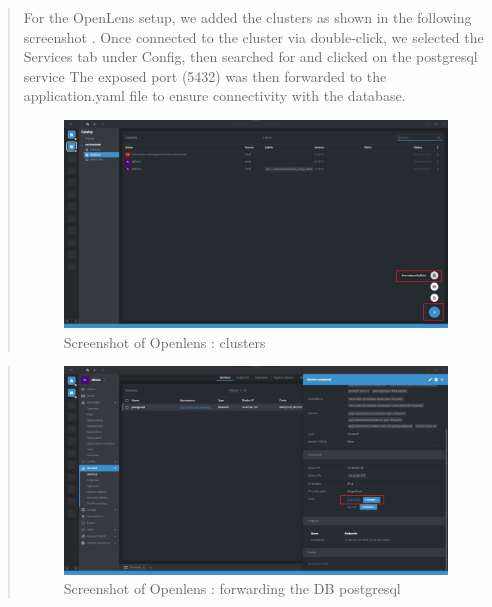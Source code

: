 \documentclass[12pt,a4paper]{report}
\begin{document}
\begin{quote}
For the OpenLens setup, we added the clusters as shown in the following
screenshot . Once connected to the cluster via double-click, we selected
the Services tab under Config, then searched for and clicked on the
postgresql service The exposed port (5432) was then forwarded to the
application.yaml file to ensure connectivity with the database.

\begin{figure}[H]
\centering
\includegraphics[width=\textwidth,height=\textheight,keepaspectratio]{media/image67.jpeg}
\caption{Screenshot of Openlens : clusters}
\label{fig:OC}
\end{figure} 

\end{quote}
\begin{quote}

\begin{figure}[H]
\centering
\includegraphics[width=\textwidth,height=\textheight,keepaspectratio]{media/image68.jpeg}
\caption{Screenshot of Openlens : forwarding the DB postgresql}
\label{fig:OFDP}
\end{figure} 

\end{quote}
\clearpage
\end{document}

